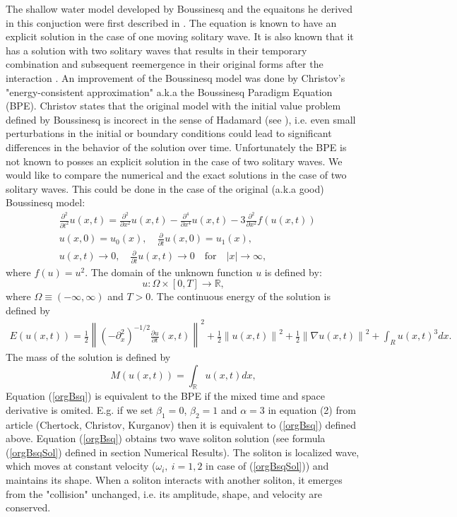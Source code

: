 \documentclass[%
 aip,
cp,  
 amsmath,amssymb,
 reprint,
]{iopconfser}
\newcommand{\be}{\begin{equation}}
\newcommand{\ee}{\end{equation}}
\newcommand{\rf}[1]{(\ref{#1})}
\newcommand{\RR}{\mathbb{R}}
\begin{document}
The shallow water model developed by Boussinesq and the equaitons he derived in this conjuction were first described in \cite{ref0}. The equation is known to have an explicit solution in the case of one moving solitary wave. It is also known that it has a solution with two solitary waves that results in their temporary combination and subsequent reemergence in their original forms after the interaction \cite{exactSol1, exactSol2}. An improvement of the Boussinesq model was done by Christov's "energy-consistent approximation" \cite{ref1} a.k.a the Boussinesq Paradigm Equation (BPE). Christov states that the original model with the initial value problem defined by Boussinesq is incorect in the sense of Hadamard (see \cite{ref1}), i.e. even small perturbations in the initial or boundary conditions could lead to significant differences in the behavior of the solution over time. Unfortunately the BPE is not known to posses an explicit solution in the case of two solitary waves. We would like to compare the numerical and the exact solutions in the case of two solitary waves. This could be done in the case of the original (a.k.a good) Boussinesq model:
\begin{align}\label{orgBsq}
&\frac{\partial^2 }{\partial t^2}u(x,t)= \frac{\partial^2}{\partial x^2}u(x,t) -  \frac{\partial^4}{\partial x^4}u(x,t) - 3\frac{\partial^2}{\partial x^2} f(u(x,t))
\\
&u(x,0) = u_0(x), \quad \frac{\partial }{\partial t}u(x,0)=u_1(x), \nonumber
\\
&u(x,t) \rightarrow 0, \quad \frac{\partial }{\partial t} u(x, t) \rightarrow 0 \quad \text{for} \quad |x| \rightarrow \infty, \nonumber
\end{align}
where $f(u) = u^2$. The domain of the unknown function $u$ is defined by:
\be
 u:\Omega \times [0, T] \rightarrow \RR,
\ee
where $\Omega \equiv (-\infty, \infty)$ and $T>0$. The continuous energy of the solution is defined by
\begin{eqnarray}\label{con-cont2}
E\left( u(x,t)\right)=	\frac{1}{2} \left\|(-\partial^2_x)^{-1/2} \frac{\partial u}{\partial t}(x,t)\right\|^2 + \frac{1}{2}  \left\|u (x,t)\right\|^2 
+ \frac{1}{2}\left\| \nabla u(x,t) \right\|^2+ \int _{R} u(x,t)^3 dx.
\end{eqnarray}
The mass of the solution is defined by
\begin{equation}\label{intM}
M(u(x,t))=\int_{\RR} u(x,t)dx,
\end{equation}
Equation \rf{orgBsq} is equivalent to the BPE if the mixed time and space derivative is omited. E.g. if we set $\beta_1 = 0$, $\beta_2 = 1$ and $\alpha = 3$ in equation (2) from article \cite{ref21} (Chertock, Christov, Kurganov) then it is equivalent to \rf{orgBsq} defined above. Equation \rf{orgBsq} obtains two wave soliton solution (see formula \rf{orgBsqSol} defined in section Numerical Results).
The soliton is localized wave, which moves at constant velocity ($\omega_i, \: i=1,2$ in case of \rf{orgBsqSol}) and maintains its shape. When a soliton interacts with another soliton, it emerges from the "collision" unchanged, i.e. its amplitude, shape, and velocity are conserved. 
\end{document}
